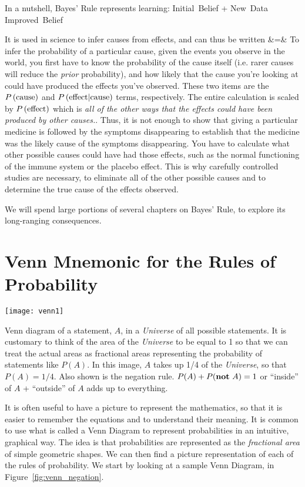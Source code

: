 In a nutshell, Bayes' Rule represents learning:
\beqn
\mbox{Initial Belief} + \mbox{New Data} \rightarrow \mbox{Improved Belief}
\eeqn

It is used in science to infer causes from effects, and can thus be written
\beqn
{} &=& 
\eeqn
To infer the probability of a particular cause, given the events you observe in the world, you first have to know the probability of the cause itself (i.e. rarer causes will reduce the {\em prior} probability), and how likely that the cause you're looking at could have produced the effects you've observed.  These two items are the $\P{cause}$ and $\Pg{effect}{cause}$ terms, respectively.  The entire calculation is scaled by $\P{effect}$ which is {\em all of the other ways that the effects could have been produced by other causes.}.  Thus, it is not enough to show that giving a particular medicine is followed by the symptoms disappearing to establish that the medicine was the likely cause of the symptoms disappearing.  You have to calculate what other possible causes could have had those effects, such as the normal functioning of the immune system or the placebo effect.  This is why carefully controlled studies are necessary, to eliminate all of the other possible causes and to determine the true cause of the effects observed.

We will spend large portions of several chapters on Bayes' Rule, to explore its long-ranging consequences.
\newpage
\section{Venn Mnemonic for the Rules of Probability}
\begin{marginfigure}
\texttt{[image: venn1]}
\caption{Venn diagram of a statement, $A$, in a {\em Universe} of all possible statements.  It is customary to think of the area of the {\em Universe} to be equal to 1 so that we can treat the actual areas as fractional areas representing the probability of statements like $P(A)$.  In this image, $A$ takes up 1/4 of the {\em Universe}, so that $P(A)=1/4$.  Also shown is the negation rule.  $P(A)+P(\mbox{{\bf not} } A)=1$ or ``inside'' of $A$ + ``outside'' of $A$ adds up to everything.}
\label{fig:venn_negation}
\end{marginfigure}

It is often useful to have a picture to represent the mathematics, so that it is easier to remember the equations and to understand their meaning.  It is common to use what is called a Venn Diagram to represent probabilities in an intuitive, graphical way.  The idea is that probabilities are represented as the {\em fractional area} of simple geometric shapes.  We can then find a picture representation of each of the rules of probability.  We start by looking at a sample Venn Diagram, in Figure~\ref{fig:venn_negation}.

